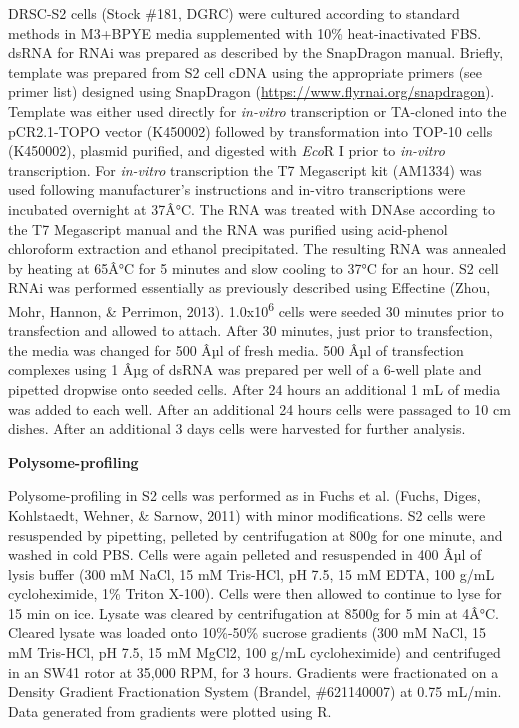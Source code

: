 \documentclass[12pt,oneside]{reedthesis}
\begin{document}
DRSC-S2 cells (Stock \#181, DGRC) were cultured according to standard methods in M3+BPYE media supplemented with 10\% heat-inactivated FBS. dsRNA for RNAi was prepared as described by the SnapDragon manual. Briefly, template was prepared from S2 cell cDNA using the appropriate primers (see primer list) designed using SnapDragon (\url{https://www.flyrnai.org/snapdragon}). Template was either used directly for \emph{in-vitro} transcription or TA-cloned into the pCR2.1-TOPO vector (K450002) followed by transformation into TOP-10 cells (K450002), plasmid purified, and digested with \emph{Eco}R I prior to \emph{in-vitro} transcription. For \emph{in-vitro} transcription the T7 Megascript kit (AM1334) was used following manufacturer's instructions and in-vitro transcriptions were incubated overnight at 37Â°C. The RNA was treated with DNAse according to the T7 Megascript manual and the RNA was purified using acid-phenol chloroform extraction and ethanol precipitated. The resulting RNA was annealed by heating at 65Â°C for 5 minutes and slow cooling to 37°C for an hour. S2 cell RNAi was performed essentially as previously described using Effectine (Zhou, Mohr, Hannon, \& Perrimon, 2013). 1.0x10\textsuperscript{6} cells were seeded 30 minutes prior to transfection and allowed to attach. After 30 minutes, just prior to transfection, the media was changed for 500 Âµl of fresh media. 500 Âµl of transfection complexes using 1 Âµg of dsRNA was prepared per well of a 6-well plate and pipetted dropwise onto seeded cells. After 24 hours an additional 1 mL of media was added to each well. After an additional 24 hours cells were passaged to 10 cm dishes. After an additional 3 days cells were harvested for further analysis.

\textbf{Polysome-profiling}

Polysome-profiling in S2 cells was performed as in Fuchs et al. (Fuchs, Diges, Kohlstaedt, Wehner, \& Sarnow, 2011) with minor modifications. S2 cells were resuspended by pipetting, pelleted by centrifugation at 800g for one minute, and washed in cold PBS. Cells were again pelleted and resuspended in 400 Âµl of lysis buffer (300 mM NaCl, 15 mM Tris-HCl, pH 7.5, 15 mM EDTA, 100 g/mL cycloheximide, 1\% Triton X-100). Cells were then allowed to continue to lyse for 15 min on ice. Lysate was cleared by centrifugation at 8500g for 5 min at 4Â°C. Cleared lysate was loaded onto 10\%-50\% sucrose gradients (300 mM NaCl, 15 mM Tris-HCl, pH 7.5, 15 mM MgCl2, 100 g/mL cycloheximide) and centrifuged in an SW41 rotor at 35,000 RPM, for 3 hours. Gradients were fractionated on a Density Gradient Fractionation System (Brandel, \#621140007) at 0.75 mL/min. Data generated from gradients were plotted using R.
\end{document}
